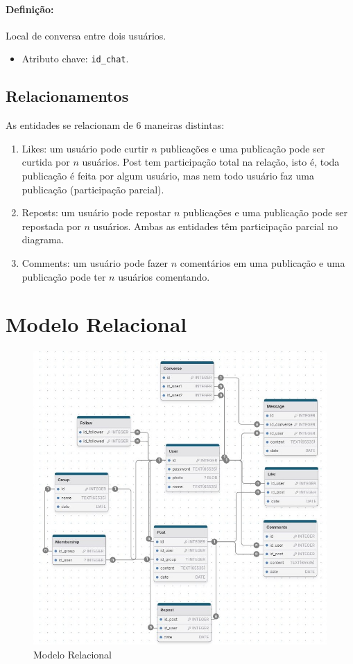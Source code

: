 \documentclass{article}
\begin{document}
\paragraph{Definição:} Local de conversa entre dois usuários.
\begin{itemize}
        \item Atributo chave: \verb|id_chat|.
\end{itemize}

\subsection{Relacionamentos}
As entidades se relacionam de 6 maneiras distintas:
\begin{enumerate}
        \item Likes: um usuário pode curtir $n$ publicações e uma publicação pode ser curtida por $n$ usuários. Post tem participação total na relação, isto é, toda publicação é feita por algum usuário, mas nem todo usuário faz uma publicação (participação parcial).
        \item Reposts: um usuário pode repostar $n$ publicações e uma publicação pode ser repostada por $n$ usuários. Ambas as entidades têm participação parcial no diagrama.
        \item Comments: um usuário pode fazer $n$ comentários em uma publicação e uma publicação pode ter $n$ usuários comentando.
\end{enumerate}

\section{Modelo Relacional}

\begin{figure}[!ht]
        \centering
        \includegraphics[width=1\textwidth]{imagens/mr.jpg}
        \caption{Modelo Relacional}
\end{figure}
\end{document}
